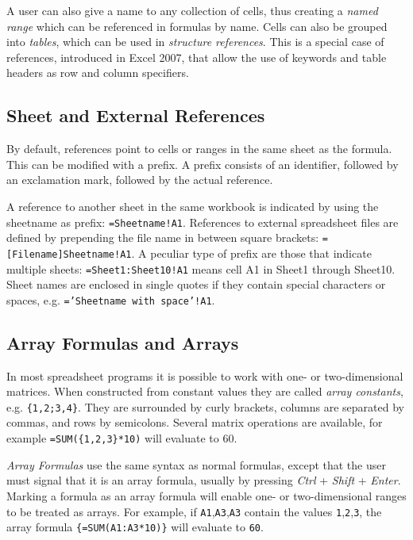 \documentclass[times]{smrauth}
\begin{document}
A user can also give a name to any collection of cells, thus creating a \emph{named range} which can be referenced in formulas by name. Cells can also be grouped into \emph{tables}, which can be used in \emph{structure references}. This is a special case of references, introduced in Excel 2007, that allow the use of keywords and table headers as row and column specifiers.

\subsection{Sheet and External References}
\label{subsection:ExternalRefsDDE}

By default, references point to cells or ranges in the same sheet as the formula. This can be modified with a prefix. A prefix consists of an identifier, followed by an exclamation mark, followed by the actual reference.

A reference to another sheet in the same workbook is indicated by using the sheetname as prefix: \texttt{=Sheetname!A1}. References to external spreadsheet files are defined by prepending the file name in between square brackets: \texttt{=[Filename]Sheetname!A1}.
A peculiar type of prefix are those that indicate multiple sheets: \texttt{=Sheet1:Sheet10!A1} means cell A1 in Sheet1 through Sheet10.
Sheet names are enclosed in single quotes if they contain special characters or spaces, e.g. \texttt{='Sheetname with space'!A1}. 

\subsection{Array Formulas and Arrays}
\label{sec:arrayformulas}
In most spreadsheet programs it is possible to work with one- or two-dimensional matrices. When constructed from constant values they are called \emph{array constants}, e.g. \texttt{\{1,2;3,4\}}.
They are surrounded by curly brackets, columns are separated by commas, and rows by semicolons.
Several matrix operations are available, for example \texttt{=SUM(\{1,2,3\}*10)} will evaluate to 60.

\emph{Array Formulas} use the same syntax as normal formulas, except that the user must signal that it is an array formula, usually by pressing \emph{Ctrl} + \emph{Shift} + \emph{Enter}.
Marking a formula as an array formula will enable one- or two-dimensional ranges to be treated as arrays.
For example, if \texttt{A1},\texttt{A3},\texttt{A3} contain the values \texttt{1},\texttt{2},\texttt{3}, the array formula \texttt{\{=SUM(A1:A3*10)\}} will evaluate to \texttt{60}.
\end{document}

